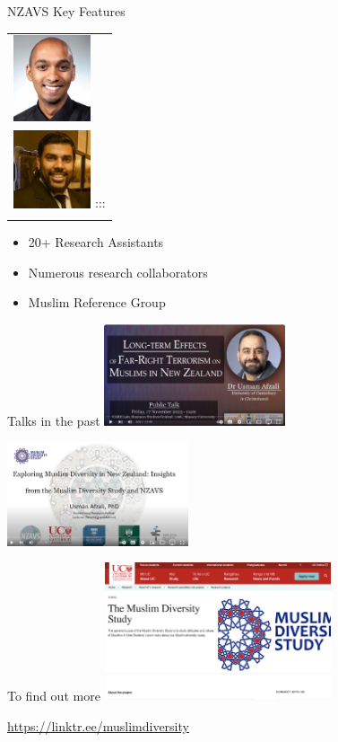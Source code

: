 \documentclass[
  ignorenonframetext,
  aspectratio=169,
]{beamer}
\providecommand{\tightlist}{%
  \setlength{\itemsep}{0pt}\setlength{\parskip}{0pt}}\usepackage{longtable,booktabs,array}
\begin{document}
\begin{frame}{NZAVS Key Features}
\begin{longtable}[]{@{}
  >{\raggedright\arraybackslash}p{}@{}}
\includegraphics[width=0.9in,height=\textheight]{figs/kumar-y.jpg} \\
\includegraphics[width=0.9in,height=\textheight]{figs/aarif-r.jpeg}
::: \\
\bottomrule\noalign{}
\end{longtable}

\begin{itemize}
\tightlist
\item
  20+ Research Assistants
\item
  Numerous research collaborators
\item
  Muslim Reference Group
\end{itemize}
\end{frame}

\begin{frame}{Talks in the past}
\label{talks-in-the-past}
\includegraphics[width=0.4\textwidth,height=\textheight]{figs/care-lecture.png}

\includegraphics[width=0.4\textwidth,height=\textheight]{figs/uc-lecture.png}
\end{frame}

\begin{frame}{To find out more}
\label{to-find-out-more}
\includegraphics[width=0.5\textwidth,height=\textheight]{figs/mds-uc-banner.png}

\url{https://linktr.ee/muslimdiversity}
\end{frame}
\end{document}
